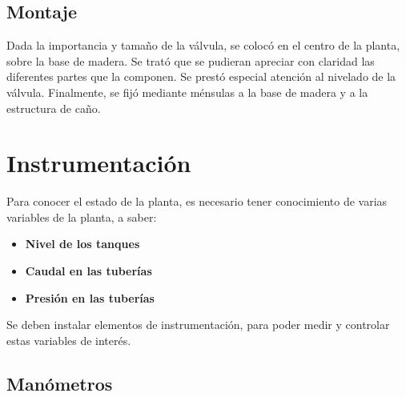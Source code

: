 \subsection{Montaje}
Dada la importancia y tamaño de la válvula, se colocó en el centro de
la planta, sobre la base de madera. Se trató que se pudieran apreciar
con claridad las diferentes partes que la componen.
Se prestó especial atención al nivelado de la válvula.
Finalmente, se fijó mediante ménsulas a la base de madera y a la estructura
de caño.

\section{Instrumentación}
\label{sec:InstrumentosMedicion}
Para conocer el estado de la planta, es necesario tener conocimiento de varias
variables de la planta, a saber:
\begin{itemize}
 \item \textbf{Nivel de los tanques}
 \item \textbf{Caudal en las tuberías}
 \item \textbf{Presión en las tuberías}
\end{itemize}
Se deben instalar elementos de instrumentación, para poder
medir y controlar estas variables de interés.

\subsection{Manómetros}
\label{subsec:Manometros}

